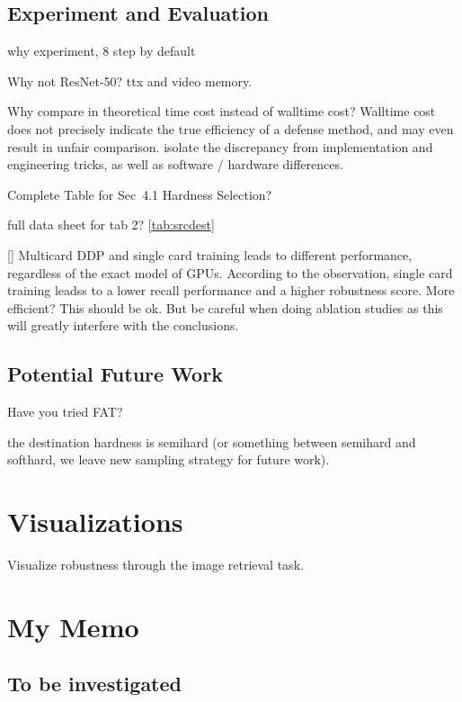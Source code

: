 \subsection{Experiment and Evaluation}

	 why experiment, 8 step by default

	 Why not ResNet-50?
		ttx and video memory.

	 Why compare in theoretical time cost instead of walltime cost?
		Walltime cost does not precisely indicate the true efficiency
		of a defense method, and may even result in unfair comparison.
		isolate the discrepancy from implementation and engineering tricks,
		as well as software / hardware differences.

	 Complete Table for Sec~4.1 Hardness Selection?

	 full data sheet for tab 2?
		\cref{tab:srcdest}

	[\xmark] Multicard DDP and single card training leads to different
		performance, regardless of the exact model of GPUs.
		According to the observation, single card training leadss to a lower
		recall performance and a higher robustness score.
		More efficient? This should be ok.
		But be careful when doing ablation studies as this will greatly
		interfere with the conclusions.
	
\subsection{Potential Future Work}

	 Have you tried FAT?

	 the destination hardness is semihard (or something between semihard
		and softhard, we leave new sampling strategy for future work).





\section{Visualizations}

Visualize robustness through the image retrieval task.

\section{My Memo}

\subsection{To be investigated}

